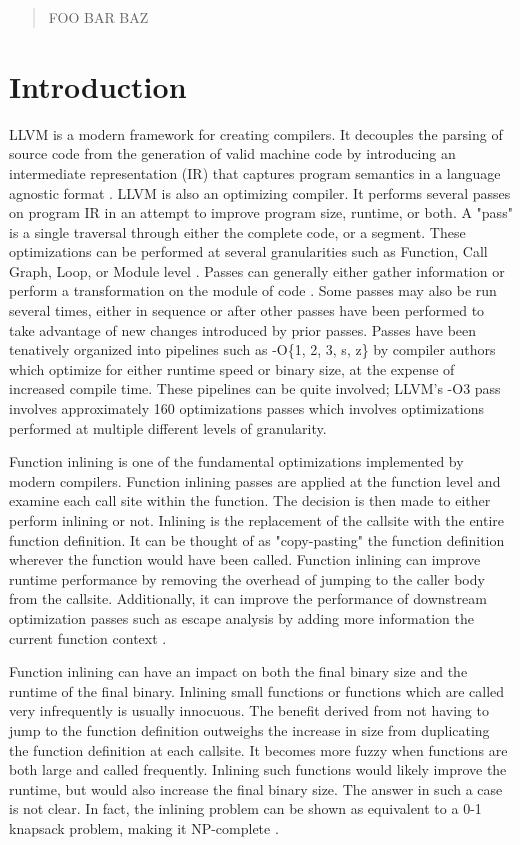 \documentclass[nohyperref]{article}
\theoremstyle{plain}
\theoremstyle{definition}
\theoremstyle{remark}
\begin{document}
\begin{abstract}
FOO BAR BAZ
\end{abstract}

\section{Introduction}
\label{introduction}
LLVM is a modern framework for creating compilers. It decouples the parsing of source code from the generation of valid machine code by introducing an intermediate representation (IR) that captures program semantics in a language agnostic format \cite{llvm-paper}. LLVM is also an optimizing compiler. It performs several passes on program IR in an attempt to improve program size, runtime, or both. A "pass" is a single traversal through either the complete code, or a segment. These optimizations can be performed at several granularities such as Function, Call Graph, Loop, or Module level \cite{lattner2008}. Passes can generally either gather information or perform a transformation on the module of code \cite{llvm-pass-docs}. Some passes may also be run several times, either in sequence or after other passes have been performed to take advantage of new changes introduced by prior passes. Passes have been tenatively organized into pipelines such as -O\{1, 2, 3, s, z\} by compiler authors which optimize for either runtime speed or binary size, at the expense of increased compile time. These pipelines can be quite involved; LLVM's -O3 pass involves approximately 160 optimizations passes which involves optimizations performed at multiple different levels of granularity.


Function inlining is one of the fundamental optimizations implemented by modern compilers. Function inlining passes are applied at the function level and examine each call site within the function. The decision is then made to either perform inlining or not. Inlining is the replacement of the callsite with the entire function definition. It can be thought of as "copy-pasting" the function definition wherever the function would have been called. Function inlining can improve runtime performance by removing the overhead of jumping to the caller body from the callsite. Additionally, it can improve the performance of downstream optimization passes such as escape analysis by adding more information the current function context \cite{Theodoridis_Grosser_Su_2022}.

Function inlining can have an impact on both the final binary size and the runtime of the final binary. Inlining small functions or functions which are called very infrequently is usually innocuous. The benefit derived from not having to jump to the function definition outweighs the increase in size from duplicating the function definition at each callsite. It becomes more fuzzy when functions are both large and called frequently. Inlining such functions would likely improve the runtime, but would also increase the final binary size. The answer in such a case is not clear. In fact, the inlining problem can be shown as equivalent to a 0-1 knapsack problem, making it NP-complete \cite{Theodoridis_Grosser_Su_2022}. 
\end{document}

